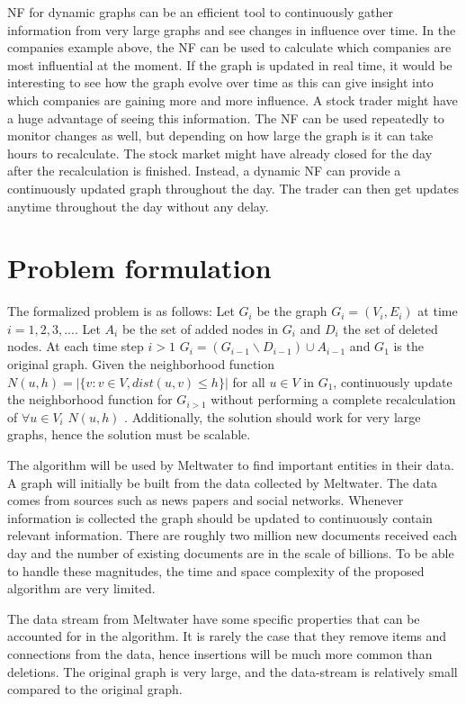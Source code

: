 NF for dynamic graphs can be an efficient tool to continuously gather information from very large graphs and see changes in influence over time. In the companies example above, the NF can be used to calculate which companies are most influential at the moment. If the graph is updated in real time, it would be interesting to see how the graph evolve over time as this can give insight into which companies are gaining more and more influence. A stock trader might have a huge advantage of seeing this information. The NF can be used repeatedly to monitor changes as well, but depending on how large the graph is it can take hours to recalculate. The stock market might have already closed for the day after the recalculation is finished. Instead, a dynamic NF can provide a continuously updated graph throughout the day. The trader can then get updates anytime throughout the day without any delay.

\section{Problem formulation}
The formalized problem is as follows: 
Let $G_i$ be the graph $G_i = (V_i,E_i)$ at time $i = 1,2,3,...$.
Let $A_i$ be the set of added nodes in $G_i$ and $D_i$ the set of deleted nodes. 
At each time step $i > 1$ $G_i = (G_{i-1} \backslash D_{i-1}) \cup A_{i-1}$ and $G_1$ is the original graph. Given the neighborhood function $N(u, h) = |\{v : v \in V, dist(u,v) \leq h \}|$ for all $u \in V$ in $G_1$, continuously update the neighborhood function for $G_{i>1}$ without performing a complete recalculation of $\forall u \in V_i$ $N(u, h)$ . Additionally, the solution should work for very large graphs, hence the solution must be scalable. 

The algorithm will be used by Meltwater to find important entities in their data. A graph will initially be built from the data collected by Meltwater. The data comes from sources such as news papers and social networks. Whenever information is collected the graph should be updated to continuously contain relevant information. There are roughly two million new documents received each day and the number of existing documents are in the scale of billions. To be able to handle these magnitudes, the time and space complexity of the proposed algorithm are very limited.

The data stream from Meltwater have some specific properties that can be accounted for in the algorithm. It is rarely the case that they remove items and connections from the data, hence insertions will be much more common than deletions. The original graph is very large, and the data-stream is relatively small compared to the original graph. 

